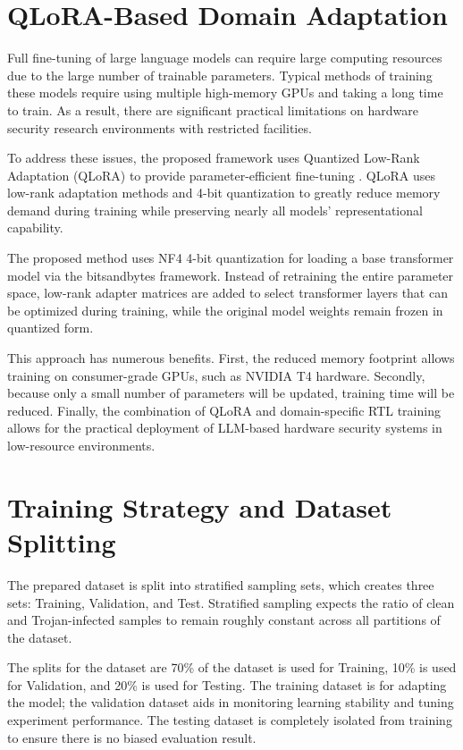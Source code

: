 \documentclass[12pt,a4paper]{report}
\begin{document}
\section{QLoRA-Based Domain Adaptation}

Full fine-tuning of large language models can require large computing resources due to the large number of trainable parameters. Typical methods of training these models require using multiple high-memory GPUs and taking a long time to train. As a result, there are significant practical limitations on hardware security research environments with restricted facilities.


To address these issues, the proposed framework uses Quantized Low-Rank Adaptation (QLoRA) to provide parameter-efficient fine-tuning \cite{ref9}. QLoRA uses low-rank adaptation methods and 4-bit quantization to greatly reduce memory demand during training while preserving nearly all models' representational capability.

The proposed method uses NF4 4-bit quantization for loading a base transformer model via the bitsandbytes framework. Instead of retraining the entire parameter space, low-rank adapter matrices are added to select transformer layers that can be optimized during training, while the original model weights remain frozen in quantized form.

This approach has numerous benefits. First, the reduced memory footprint allows training on consumer-grade GPUs, such as NVIDIA T4 hardware. Secondly, because only a small number of parameters will be updated, training time will be reduced. Finally, the combination of QLoRA and domain-specific RTL training allows for the practical deployment of LLM-based hardware security systems in low-resource environments.

\section{Training Strategy and Dataset Splitting}

The prepared dataset is split into stratified sampling sets, which creates three sets: Training, Validation, and Test. Stratified sampling expects the ratio of clean and Trojan-infected samples to remain roughly constant across all partitions of the dataset.

The splits for the dataset are 70\% of the dataset is used for Training, 10\% is used for Validation, and 20\% is used for Testing. The training dataset is for adapting the model; the validation dataset aids in monitoring learning stability and tuning experiment performance. The testing dataset is completely isolated from training to ensure there is no biased evaluation result.
\end{document}
